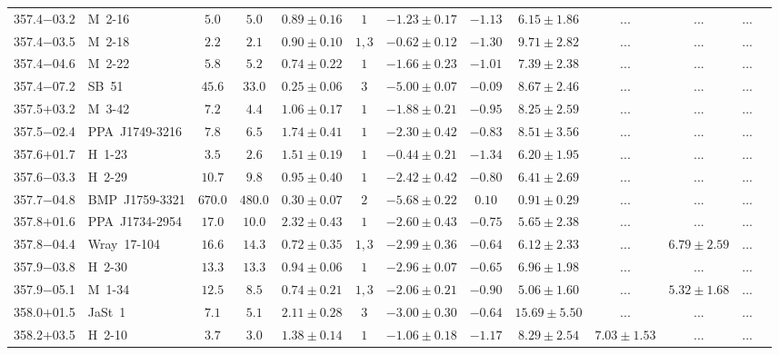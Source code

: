 \documentclass[useAMS]{mn2e}
\begin{document}
\begin{center}
{\begin{longtable}{llccccccccccc}
357.4$-$03.2&M~2-16&$       5.0$&$       5.0$&$0.89 \pm 0.16$&$1$&$-1.23 \pm 0.17$&$     -1.13$&$6.15 \pm 1.86$&$...$&$...$&...\\
357.4$-$03.5&M~2-18&$       2.2$&$       2.1$&$0.90 \pm 0.10$&$1,3$&$-0.62 \pm 0.12$&$     -1.30$&$9.71 \pm 2.82$&$...$&$...$&...\\
357.4$-$04.6&M~2-22&$       5.8$&$       5.2$&$0.74 \pm 0.22$&$1$&$-1.66 \pm 0.23$&$     -1.01$&$7.39 \pm 2.38$&$...$&$...$&...\\
357.4$-$07.2&SB~51&$      45.6$&$      33.0$&$0.25 \pm 0.06$&$3$&$-5.00 \pm 0.07$&$     -0.09$&$8.67 \pm 2.46$&$...$&$...$&...\\
357.5$+$03.2&M~3-42&$       7.2$&$       4.4$&$1.06 \pm 0.17$&$1$&$-1.88 \pm 0.21$&$     -0.95$&$8.25 \pm 2.59$&$...$&$...$&...\\
357.5$-$02.4&PPA~J1749-3216&$       7.8$&$       6.5$&$1.74 \pm 0.41$&$1$&$-2.30 \pm 0.42$&$     -0.83$&$8.51 \pm 3.56$&$...$&$...$&...\\
357.6$+$01.7&H~1-23&$       3.5$&$       2.6$&$1.51 \pm 0.19$&$1$&$-0.44 \pm 0.21$&$     -1.34$&$6.20 \pm 1.95$&$...$&$...$&...\\
357.6$-$03.3&H~2-29&$      10.7$&$       9.8$&$0.95 \pm 0.40$&$1$&$-2.42 \pm 0.42$&$     -0.80$&$6.41 \pm 2.69$&$...$&$...$&...\\
357.7$-$04.8&BMP~J1759-3321&$     670.0$&$     480.0$&$0.30 \pm 0.07$&$2$&$-5.68 \pm 0.22$&$      0.10$&$0.91 \pm 0.29$&$...$&$...$&...\\
357.8$+$01.6&PPA~J1734-2954&$      17.0$&$      10.0$&$2.32 \pm 0.43$&$1$&$-2.60 \pm 0.43$&$     -0.75$&$5.65 \pm 2.38$&$...$&$...$&...\\
357.8$-$04.4&Wray~17-104&$      16.6$&$      14.3$&$0.72 \pm 0.35$&$1,3$&$-2.99 \pm 0.36$&$     -0.64$&$6.12 \pm 2.33$&$...$&$6.79 \pm 2.59$&...\\
357.9$-$03.8&H~2-30&$      13.3$&$      13.3$&$0.94 \pm 0.06$&$1$&$-2.96 \pm 0.07$&$     -0.65$&$6.96 \pm 1.98$&$...$&$...$&...\\
357.9$-$05.1&M~1-34&$      12.5$&$       8.5$&$0.74 \pm 0.21$&$1,3$&$-2.06 \pm 0.21$&$     -0.90$&$5.06 \pm 1.60$&$...$&$5.32 \pm 1.68$&...\\
358.0$+$01.5&JaSt~1&$       7.1$&$       5.1$&$2.11 \pm 0.28$&$3$&$-3.00 \pm 0.30$&$     -0.64$&$15.69 \pm 5.50$&$...$&$...$&...\\
358.2$+$03.5&H~2-10&$       3.7$&$       3.0$&$1.38 \pm 0.14$&$1$&$-1.06 \pm 0.18$&$     -1.17$&$8.29 \pm 2.54$&$7.03 \pm 1.53$&$...$&...\\

\end{longtable}}
\end{center}
\end{document}
